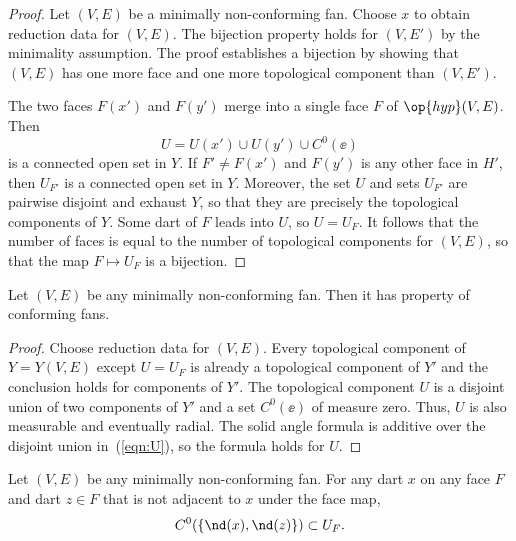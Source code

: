 \begin{proof} Let $(V,E)$ be a minimally non-conforming fan.  Choose
  $x$ to obtain reduction data for $(V,E)$.  The bijection property
  holds for $(V,E')$ by the minimality assumption.  The proof 
  establishes a bijection by showing that $(V,E)$ has one more face and
  one more topological component than $(V,E')$.

The
two faces $F(x')$ and $F(y')$ merge into a single face $F$ of
$\op{hyp}(V,E)$.  Then
\begin{equation}\label{eqn:U}
U= U(x')\cup U(y')\cup C^0(\ee)
\end{equation} 
is a connected open set in $Y$.  If $F'\ne F(x')$ and $F(y')$ is any other
face in $H'$, then $U_{F'}$ is a connected open set in $Y$.  Moreover,
the set $U$ and sets $U_{F'}$ are pairwise disjoint and exhaust $Y$,
so that they are precisely the topological components of $Y$.  Some
dart of $F$ leads into $U$, so $U=U_F$. 
It follows that the number of
faces is equal to the number of topological components for $(V,E)$, so that the
map $F\mapsto U_F$ is a bijection.
\end{proof}


\begin{lemma}[] Let $(V,E)$ be any minimally
non-conforming fan.  Then it has property  of
conforming fans.
\end{lemma}

\begin{proof} Choose reduction data for $(V,E)$.  Every topological
component of $Y=Y(V,E)$ except $U=U_F$ is already a topological
component of $Y'$ and the conclusion holds for components of $Y'$.
The topological component $U$ is a disjoint union of two components
of $Y'$ and a set $C^0(\ee)$ of measure zero.  Thus, $U$ is also
measurable and eventually radial.  The solid angle formula is
additive over the disjoint union in~(\ref{eqn:U}), so the formula
holds for $U$.
\end{proof}
%


\begin{lemma}[] Let $(V,E)$ be any minimally
non-conforming fan.  For any dart $x$ on any face $F$ and dart $z\in
F$ that is not adjacent to $x$ under the face map,
\begin{displaymath}
C^0(\{\nd(x),\nd(z)\}) \subset U_F.
\end{displaymath}
\end{lemma}

